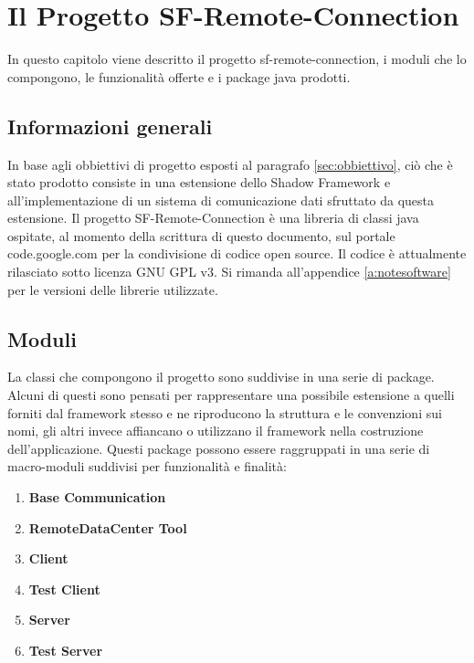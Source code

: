 
\chapter{Il Progetto SF-Remote-Connection}
\label{ch:sfremoteconnection}
In questo capitolo viene descritto il progetto sf-remote-connection, i moduli che lo compongono, le funzionalità offerte e i package java prodotti.

\section{Informazioni generali} 
\label{sec:geninfo}
In base agli obbiettivi di progetto esposti al paragrafo \ref{sec:obbiettivo}, ciò che è stato prodotto consiste in una estensione dello %
Shadow Framework e all'implementazione di un sistema di comunicazione dati sfruttato da questa estensione.
Il progetto SF-Remote-Connection è una libreria di classi java ospitate, al momento della scrittura di questo documento, sul portale %
code.google.com per la condivisione di codice open source.
Il codice è attualmente rilasciato sotto licenza GNU GPL v3.
Si rimanda all'appendice \ref{a:notesoftware} per le versioni delle librerie utilizzate.

\section{Moduli} 
\label{sec:moduli}
La classi che compongono il progetto sono suddivise in una serie di package. %
Alcuni di questi sono pensati per rappresentare una possibile estensione a quelli forniti dal framework stesso e ne riproducono la struttura e le convenzioni sui nomi, gli altri invece affiancano o utilizzano il framework nella costruzione dell'applicazione.
Questi package possono essere raggruppati in una serie di macro-moduli suddivisi per funzionalità e finalità:
\begin{enumerate}
	\item \textbf{Base Communication}
	\item \textbf{RemoteDataCenter Tool}
	\item \textbf{Client}
	\item \textbf{Test Client}
	\item \textbf{Server}         
	\item \textbf{Test Server}
\end{enumerate}

